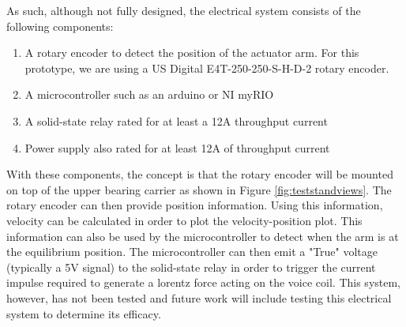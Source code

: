 \noindent As such, although not fully designed, the electrical system consists of the following components:

\begin{enumerate}
\item A rotary encoder to detect the position of the actuator arm. For this prototype, we are using a US Digital E4T-250-250-S-H-D-2 rotary encoder.
\item A microcontroller such as an arduino or NI myRIO
\item A solid-state relay rated for at least a 12A throughput current
\item Power supply also rated for at least 12A of throughput current
\end{enumerate}

\noindent With these components, the concept is that the rotary encoder will be mounted on top of the upper bearing carrier as shown in Figure \ref{fig:teststandviews}. The rotary encoder can then provide position information. Using this information, velocity can be calculated in order to plot the velocity-position plot. This information can also be used by the microcontroller to detect when the arm is at the equilibrium position. The microcontroller can then emit a "True" voltage (typically a 5V signal) to the solid-state relay in order to trigger the current impulse required to generate a lorentz force acting on the voice coil. This system, however, has not been tested and future work will include testing this electrical system to determine its efficacy.